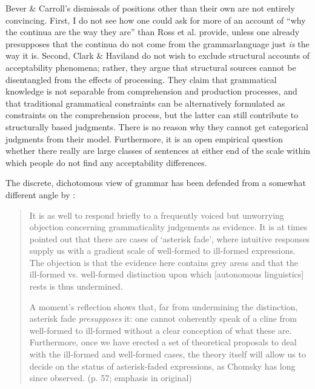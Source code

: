 Bever \& Carroll's dismissals of positions other than their own are not entirely convincing. First, I do not see how one could ask for more of an account of ``why the continua are the way they are'' than Ross et al. provide, unless one already presupposes that  the continua  do not  come from the  grammar\schdash{}language just \textit{is} the way it is. Second, Clark \& Haviland do not wish to exclude structural accounts of acceptability phenomena; rather, they argue that structural sources cannot be disentangled from the effects of processing. They claim that grammatical knowledge is not separable from comprehension and production processes, and that traditional grammatical constraints can be alternatively formulated as constraints on the comprehension process, but the latter can still contribute to structurally based judgments. There is no reason why they cannot get categorical judgments from their model. Furthermore, it is an open empirical  question whether there really are large classes of sentences at either end of the scale within which people do not find any acceptability differences.

The  discrete,  dichotomous  view  of  grammar  has  been  defended  from  a somewhat different angle by \citet{Carr1990}:

\begin{quote}
It is as well to respond briefly to a frequently voiced but unworrying objection concerning grammaticality judgements as evidence. It is at
times pointed out that there are cases of `asterisk fade', where intuitive responses supply us with a gradient scale of well-formed to ill-formed expressions. The objection is that the evidence here contains grey areas and that the ill-formed vs. well-formed distinction upon which  [autonomous linguistics] rests is thus undermined.

A moment's reflection shows that, far from undermining the distinction, asterisk fade \textit{presupposes} it: one cannot coherently speak of a cline from well-formed to ill-formed without a clear conception of what these are. Furthermore, once we have erected a set of theoretical proposals to deal with the ill-formed and well-formed cases, the theory itself will allow us to decide on the status of asterisk-faded expressions, as Chomsky has long since observed. (p. 57; emphasis in original)
\end{quote}

